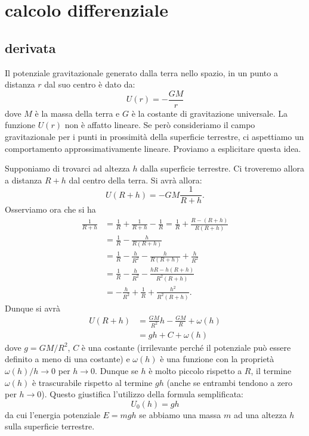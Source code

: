 \chapter{calcolo differenziale}
\label{ch:differenziale}

\section{derivata}

Il potenziale gravitazionale generato dalla terra nello spazio, in un punto
a distanza $r$ dal suo centro è dato da:
\[
U(r) = -\frac{GM}{r}
\]
dove $M$ è la massa della terra e $G$ è la costante di gravitazione universale.
La funzione $U(r)$ non è affatto lineare. Se però consideriamo il
campo gravitazionale per i punti in prossimità della
superficie terrestre, ci aspettiamo un comportamento approssimativamente
lineare. Proviamo a esplicitare questa idea.

Supponiamo di trovarci ad altezza $h$ dalla superficie terrestre. Ci
troveremo allora a distanza $R+h$ dal centro della terra. Si avrà allora:
\[
  U(R+h) = -GM\frac{1}{R+h}.
\]
Osserviamo ora che si ha
\begin{align*}
  \frac{1}{R+h}
  & = \frac{1}{R} + \frac{1}{R+h} - \frac{1}{R}
   = \frac 1 R + \frac{R-(R+h)}{R(R+h)} \\
  & = \frac 1 R - \frac{h}{R(R+h)} \\
  & = \frac 1 R - \frac{h}{R^2} - \frac{h}{R(R+h)} + \frac{h}{R^2} \\
  & = \frac 1 R - \frac{h}{R^2} - \frac{hR - h(R + h)}{R^2(R+h)} \\
  & = - \frac{h}{R^2} + \frac 1 R + \frac{h^2}{R^2(R+h)}.
\end{align*}
Dunque si avrà
\begin{align*}
  U(R+h) &= \frac{GM}{R^2} h - \frac{GM}{R} + \omega(h)\\
  &= g h + C + \omega(h)
\end{align*}
dove $g = GM/R^2$, $C$ è una costante (irrilevante perché il
potenziale può essere definito a meno di una costante) e
$\omega(h)$ è una funzione con la proprietà $\omega(h)/h\to 0$
per $h\to 0$. Dunque se $h$ è molto piccolo rispetto a $R$, il termine
$\omega(h)$ è trascurabile rispetto al termine $gh$ (anche se entrambi
tendono a zero per $h\to 0$). Questo giustifica
l'utilizzo della formula
semplificata:
\[
U_0(h) = gh
\]
da cui l'energia potenziale $E = mgh$
se abbiamo una massa $m$ ad una altezza $h$ sulla superficie terrestre.

